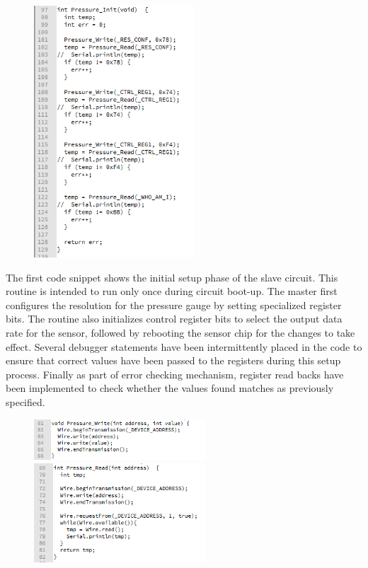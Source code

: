 \documentclass{article}
\begin{document}
\begin{figure}[!ht]
\centering 
\includegraphics[width=6cm]{1.png}
\end{figure}

\noindent The first code snippet shows the initial setup phase of the slave circuit. This routine is intended to run only once during circuit boot-up. The master first configures the resolution for the pressure gauge by setting specialized register bits. The routine also initializes control register bits to select the output data rate for the sensor, followed by rebooting the sensor chip for the changes to take effect. Several debugger statements have been intermittently placed in the code to ensure that correct values have been passed to the registers during this setup process. Finally as part of error checking mechanism, register read backs have been implemented to check whether the values found matches as previously specified.

\begin{figure}[!ht]
\centering 
\includegraphics[width=6.4cm]{2.png}
\includegraphics[width=6.4cm]{3.png}
\end{figure}
\end{document}

